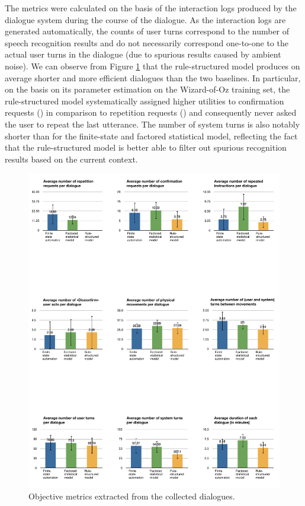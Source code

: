 The metrics were calculated on the basis of the interaction logs produced by the dialogue system during the course of the dialogue. As the interaction logs are generated automatically, the counts of user turns correspond to the number of speech recognition results and do not necessarily correspond one-to-one to the actual user turns in the dialogue (due to spurious results caused by ambient noise). We can observe from Figure \ref{fig:objective} that the rule-structured model produces on average shorter and more efficient dialogues than the two baselines.  In particular, on the basis on its parameter estimation on the Wizard-of-Oz training set, the rule-structured model systematically assigned higher utilities to confirmation requests () in comparison to repetition requests () and 
consequently never asked the user to repeat the last utterance. The number of system turns is also notably shorter than for the finite-state and factored statistical model, reflecting the fact that the rule-structured model is better able to filter out spurious recognition results based on the current context. 

\begin{figure}[p]
\begin{center}
\includegraphics[scale=0.5]{imgs/objective.pdf}
\end{center} 
\caption{Objective metrics extracted from the collected dialogues. }
\label{fig:objective}
\end{figure}


